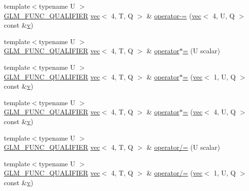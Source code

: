 \begin{DoxyCompactItemize}
\item 
{\footnotesize template$<$typename U $>$ }\\\hyperlink{setup_8hpp_a33fdea6f91c5f834105f7415e2a64407}{G\+L\+M\+\_\+\+F\+U\+N\+C\+\_\+\+Q\+U\+A\+L\+I\+F\+I\+ER} \hyperlink{structglm_1_1vec}{vec}$<$ 4, T, Q $>$ \& \hyperlink{structglm_1_1vec_3_014_00_01_t_00_01_q_01_4_ae943070d1a4e295555306d52eab887c4}{operator-\/=} (\hyperlink{structglm_1_1vec}{vec}$<$ 4, U, Q $>$ const \&\hyperlink{_s_d_l__opengl_8h_a10a82eabcb59d2fcd74acee063775f90}{v})
\item 
{\footnotesize template$<$typename U $>$ }\\\hyperlink{setup_8hpp_a33fdea6f91c5f834105f7415e2a64407}{G\+L\+M\+\_\+\+F\+U\+N\+C\+\_\+\+Q\+U\+A\+L\+I\+F\+I\+ER} \hyperlink{structglm_1_1vec}{vec}$<$ 4, T, Q $>$ \& \hyperlink{structglm_1_1vec_3_014_00_01_t_00_01_q_01_4_ada4128504595a3a6aae32660a1461dea}{operator$\ast$=} (U scalar)
\item 
{\footnotesize template$<$typename U $>$ }\\\hyperlink{setup_8hpp_a33fdea6f91c5f834105f7415e2a64407}{G\+L\+M\+\_\+\+F\+U\+N\+C\+\_\+\+Q\+U\+A\+L\+I\+F\+I\+ER} \hyperlink{structglm_1_1vec}{vec}$<$ 4, T, Q $>$ \& \hyperlink{structglm_1_1vec_3_014_00_01_t_00_01_q_01_4_af1a51a8de8525cfcb5273513daaf1b04}{operator$\ast$=} (\hyperlink{structglm_1_1vec}{vec}$<$ 1, U, Q $>$ const \&\hyperlink{_s_d_l__opengl_8h_a10a82eabcb59d2fcd74acee063775f90}{v})
\item 
{\footnotesize template$<$typename U $>$ }\\\hyperlink{setup_8hpp_a33fdea6f91c5f834105f7415e2a64407}{G\+L\+M\+\_\+\+F\+U\+N\+C\+\_\+\+Q\+U\+A\+L\+I\+F\+I\+ER} \hyperlink{structglm_1_1vec}{vec}$<$ 4, T, Q $>$ \& \hyperlink{structglm_1_1vec_3_014_00_01_t_00_01_q_01_4_a8223cbe0c80067bda5e8a87ebc4098cf}{operator$\ast$=} (\hyperlink{structglm_1_1vec}{vec}$<$ 4, U, Q $>$ const \&\hyperlink{_s_d_l__opengl_8h_a10a82eabcb59d2fcd74acee063775f90}{v})
\item 
{\footnotesize template$<$typename U $>$ }\\\hyperlink{setup_8hpp_a33fdea6f91c5f834105f7415e2a64407}{G\+L\+M\+\_\+\+F\+U\+N\+C\+\_\+\+Q\+U\+A\+L\+I\+F\+I\+ER} \hyperlink{structglm_1_1vec}{vec}$<$ 4, T, Q $>$ \& \hyperlink{structglm_1_1vec_3_014_00_01_t_00_01_q_01_4_ab603e1376b20ee1ba7060973d0028adb}{operator/=} (U scalar)
\item 
{\footnotesize template$<$typename U $>$ }\\\hyperlink{setup_8hpp_a33fdea6f91c5f834105f7415e2a64407}{G\+L\+M\+\_\+\+F\+U\+N\+C\+\_\+\+Q\+U\+A\+L\+I\+F\+I\+ER} \hyperlink{structglm_1_1vec}{vec}$<$ 4, T, Q $>$ \& \hyperlink{structglm_1_1vec_3_014_00_01_t_00_01_q_01_4_a7ee45c65277f9dfee48514e35d163a6a}{operator/=} (\hyperlink{structglm_1_1vec}{vec}$<$ 1, U, Q $>$ const \&\hyperlink{_s_d_l__opengl_8h_a10a82eabcb59d2fcd74acee063775f90}{v})

\end{DoxyCompactItemize}
